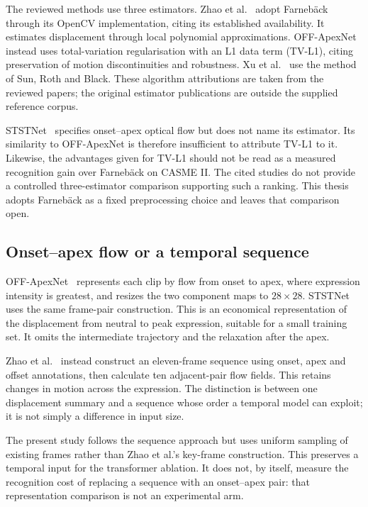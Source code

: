 The reviewed methods use three estimators. Zhao et al.~\cite{zhaoS2021} adopt Farneb\"ack through its OpenCV implementation, citing its established availability. It estimates displacement through local polynomial approximations. OFF-ApexNet~\cite{liong2019a} instead uses total-variation regularisation with an L1 data term (TV-L1), citing preservation of motion discontinuities and robustness. Xu et al.~\cite{xu2017} use the method of Sun, Roth and Black. These algorithm attributions are taken from the reviewed papers; the original estimator publications are outside the supplied reference corpus.

STSTNet~\cite{liong2019b} specifies onset--apex optical flow but does not name its estimator. Its similarity to OFF-ApexNet is therefore insufficient to attribute TV-L1 to it. Likewise, the advantages given for TV-L1 should not be read as a measured recognition gain over Farneb\"ack on CASME II. The cited studies do not provide a controlled three-estimator comparison supporting such a ranking. This thesis adopts Farneb\"ack as a fixed preprocessing choice and leaves that comparison open.

\subsection{Onset--apex flow or a temporal sequence}
\label{sec:flow-what-between}

OFF-ApexNet~\cite{liong2019a} represents each clip by flow from onset to apex, where expression intensity is greatest, and resizes the two component maps to $28\times28$. STSTNet~\cite{liong2019b} uses the same frame-pair construction. This is an economical representation of the displacement from neutral to peak expression, suitable for a small training set. It omits the intermediate trajectory and the relaxation after the apex.

Zhao et al.~\cite{zhaoS2021} instead construct an eleven-frame sequence using onset, apex and offset annotations, then calculate ten adjacent-pair flow fields. This retains changes in motion across the expression. The distinction is between one displacement summary and a sequence whose order a temporal model can exploit; it is not simply a difference in input size.

The present study follows the sequence approach but uses uniform sampling of existing frames rather than Zhao et al.'s key-frame construction. This preserves a temporal input for the transformer ablation. It does not, by itself, measure the recognition cost of replacing a sequence with an onset--apex pair: that representation comparison is not an experimental arm.

